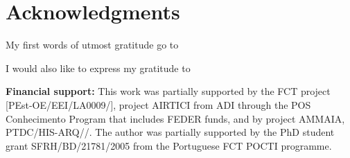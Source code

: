 \chapter{Acknowledgments}

My first words of utmost gratitude go to 

I would also like to express my gratitude to 







\noindent \textbf{Financial support:} 
This work was partially supported by the FCT project [PEst\hyp{}OE/\-EEI/\-LA0009/], 
project AIRTICI from ADI through the POS Conhecimento Program that includes 
FEDER funds, and by project AMMAIA, PTDC\-/HIS\hyp{}ARQ//. 
The author was partially supported by the PhD student grant 
SFRH/BD/21781/2005 from the Portuguese FCT POCTI programme.

